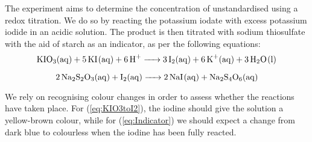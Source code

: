 The experiment aims to determine the concentration of unstandardised  using a redox titration. We do so by reacting the potassium iodate with excess potassium iodide in an acidic solution. The product is then titrated with sodium thiosulfate with the aid of starch as an indicator, as per the following equations:
\begin{equation}\label{eq:KIO3toI2}
	\ce{KIO3(aq) + 5KI(aq) + 6H+ -> 3I2(aq) + 6K+(aq) + 3H2O(l)}
\end{equation}

\begin{equation}\label{eq:Indicator}
	\ce{2Na2S2O3(aq) + I2(aq) -> 2NaI(aq) + Na2S4O6(aq)}
\end{equation}

We rely on recognising colour changes in order to assess whether the reactions have taken place. For (\ref{eq:KIO3toI2}), the iodine should give the solution a yellow-brown colour, while for (\ref{eq:Indicator}) we should expect a change from dark blue to colourless when the iodine has been fully reacted.